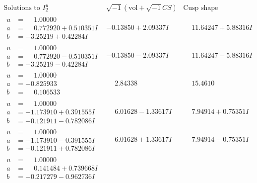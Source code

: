 \documentclass[1p]{elsarticle_modified}
\theoremstyle{definition}
\newcommand{\I}{\sqrt{-1}}
\begin{document}
$$\begin{array}{c|c|c}  
\text{Solutions to }I^u_{2}& \I (\text{vol} + \sqrt{-1}CS) & \text{Cusp shape}\\
 \hline 
\begin{aligned}
u &= \phantom{-}1.00000\phantom{ +0.000000I} \\
a &= \phantom{-}0.772920 + 0.510351 I \\
b &= -3.25219 + 0.42284 I\end{aligned}
 & -0.13850 + 2.09337 I & \phantom{-}11.64247 + 5.88316 I \\ \hline\begin{aligned}
u &= \phantom{-}1.00000\phantom{ +0.000000I} \\
a &= \phantom{-}0.772920 - 0.510351 I \\
b &= -3.25219 - 0.42284 I\end{aligned}
 & -0.13850 - 2.09337 I & \phantom{-}11.64247 - 5.88316 I \\ \hline\begin{aligned}
u &= \phantom{-}1.00000\phantom{ +0.000000I} \\
a &= -0.825933\phantom{ +0.000000I} \\
b &= \phantom{-}0.106533\phantom{ +0.000000I}\end{aligned}
 & \phantom{-}2.84338\phantom{ +0.000000I} & \phantom{-}15.4610\phantom{ +0.000000I} \\ \hline\begin{aligned}
u &= \phantom{-}1.00000\phantom{ +0.000000I} \\
a &= -1.173910 + 0.391555 I \\
b &= -0.121911 - 0.782086 I\end{aligned}
 & \phantom{-}6.01628 - 1.33617 I & \phantom{-}7.94914 + 0.75351 I \\ \hline\begin{aligned}
u &= \phantom{-}1.00000\phantom{ +0.000000I} \\
a &= -1.173910 - 0.391555 I \\
b &= -0.121911 + 0.782086 I\end{aligned}
 & \phantom{-}6.01628 + 1.33617 I & \phantom{-}7.94914 - 0.75351 I \\ \hline\begin{aligned}
u &= \phantom{-}1.00000\phantom{ +0.000000I} \\
a &= \phantom{-}0.141484 + 0.739668 I \\
b &= -0.217279 - 0.962736 I\end{aligned}

\end{array}$$
\end{document}
